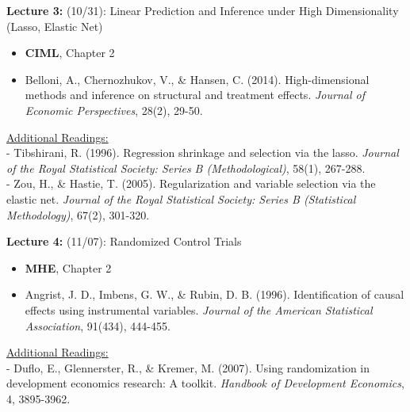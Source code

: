 \documentclass[12pt]{article}
\begin{document}
\vspace{2em}
\noindent\textbf{Lecture 3:} (10/31): Linear Prediction and Inference under High Dimensionality (Lasso, Elastic Net) \\
\vspace{1em}
\begin{itemize}
    \item \textbf{CIML}, Chapter 2
    \item Belloni, A., Chernozhukov, V., \& Hansen, C. (2014). High-dimensional methods and inference on structural and treatment effects. \textit{Journal of Economic Perspectives}, 28(2), 29-50.
\end{itemize}
\vspace{1em}
\underline{Additional Readings:} \\
\hspace{1em} - Tibshirani, R. (1996). Regression shrinkage and selection via the lasso. \textit{Journal of the Royal Statistical Society: Series B (Methodological)}, 58(1), 267-288. \\
\hspace{1em} - Zou, H., \& Hastie, T. (2005). Regularization and variable selection via the elastic net. \textit{Journal of the Royal Statistical Society: Series B (Statistical Methodology)}, 67(2), 301-320.

\vspace{2em}
\noindent\textbf{Lecture 4:} (11/07): Randomized Control Trials \\
\vspace{1em}
\begin{itemize}
    \item \textbf{MHE}, Chapter 2
    \item Angrist, J. D., Imbens, G. W., \& Rubin, D. B. (1996). Identification of causal effects using instrumental variables. \textit{Journal of the American Statistical Association}, 91(434), 444-455.
\end{itemize}
\vspace{1em}
\underline{Additional Readings:} \\
\hspace{1em} - Duflo, E., Glennerster, R., \& Kremer, M. (2007). Using randomization in development economics research: A toolkit. \textit{Handbook of Development Economics}, 4, 3895-3962.
\end{document}
